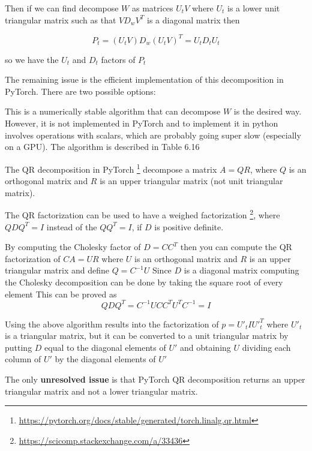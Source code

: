 \documentclass{article}
\newcounter{subsubparagraph}
\begin{document}
Then if we can find decompose $W$ as matrices $U_tV$ where $U_t$ is a lower unit triangular matrix such as that $VD_wV^T$ is a diagonal matrix then

\begin{equation}
    P_t = (U_tV)D_w(U_tV)^T = U_tD_tU_t
\end{equation}

so we have the $U_t$ and $D_t$ factors of $P_t$

The remaining issue is the efficient implementation of this decomposition in PyTorch. There are two possible options:


This is a numerically stable algorithm that can decompose $W$ is the desired way. However, it is not implemented in PyTorch and to implement it in python involves operations with scalars, which are probably going super slow (especially on a GPU). The algorithm is described in \cite{mohinder_s_grewal_kalman_2001} Table 6.16


The QR decomposition in PyTorch \footnote{\url{https://pytorch.org/docs/stable/generated/torch.linalg.qr.html}} decompose a matrix $A = QR$, where $Q$ is an orthogonal matrix and $R$ is an upper triangular matrix (not unit triangular matrix).

The QR factorization can be used to have a weighed factorization \footnote{\url{https://scicomp.stackexchange.com/a/33436}}, where $QDQ^T = I$ instead of the $QQ^T = I$, if $D$ is positive definite.

By computing the Cholesky factor of $D = CC^T$ then you can compute the QR factorization of $CA=UR$ where $U$ is an orthogonal matrix and $R$ is an upper triangular matrix and define $Q=C^{-1}U$
Since $D$ is a diagonal matrix computing the Cholesky decomposition can be done by taking the square root of every element
This can be proved as 
$$Q D Q^T = C^{-1}U CC^TU^TC^{-1}= I$$

Using the above algorithm results into the factorization of $p = U\prime_tIU\prime^T_t$ where $U\prime_t$ is a triangular matrix, but it can be converted to a unit triangular matrix by putting $D$ equal to the diagonal elements of $U\prime$ and obtaining $U$ dividing each column of $U\prime$ by the diagonal elements of $U\prime$

The only \textbf{unresolved issue} is that PyTorch QR decomposition returns an upper triangular matrix and not a lower triangular matrix.
\end{document}
